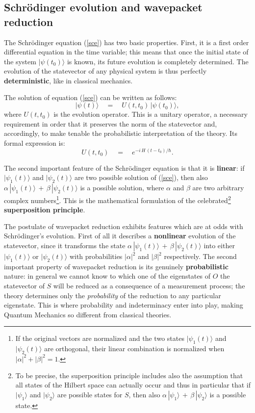 \documentclass[12pt]{article}
\begin{document}
\subsection{Schr\"odinger evolution and wavepacket reduction}
\label{sec12}

The Schr\"odinger equation (\ref{sce}) has two basic properties.
First, it is a first order differential equation in the time
variable; this means that once the initial state of the system
$|\psi(t_{0})\rangle$ is known, its future evolution is completely
determined. The evolution of the statevector of any physical
system is thus perfectly {\bf deterministic}, like in classical
mechanics.

The solution of equation (\ref{sce}) can be written as follows:
\begin{equation}
|\psi(t)\rangle \quad = \quad U(t, t_{0})\, |\psi(t_{0})\rangle,
\end{equation}
where $U(t, t_{0})$ is the evolution operator. This is a unitary
operator, a necessary requirement in order that it preserves the
norm of the statevector and, accordingly, to make tenable the
probabilistic interpretation of the theory. Its formal expression
is:
\begin{equation}
U(t, t_{0}) \quad = \quad e^{\displaystyle -i\, H\,
(t-t_{0})/\hbar}.
\end{equation}

The second important feature of the Schr\"odinger equation is that
it is {\bf linear}: if $|\psi_{1}(t)\rangle$ and
$|\psi_{2}(t)\rangle$ are two possible solution of (\ref{sce}),
then also $\alpha\, |\psi_{1}(t)\rangle \, + \, \beta\,
|\psi_{2}(t)\rangle$ is a possible solution, where $\alpha$ and
$\beta$ are two arbitrary complex numbers\footnote{If the original
vectors are normalized and the two states $|\psi_{1}(t)\rangle$
and $|\psi_{2}(t)\rangle$ are orthogonal, their linear combination
is normalized when $|\alpha|^{2} + |\beta|^{2} = 1$.}. This is the
mathematical formulation of the celebrated\footnote{To be precise,
the superposition principle includes also the assumption that all
states of the Hilbert space can actually occur and thus in
particular that if $|\psi_{1}\rangle$ and $|\psi_{2}\rangle$ are
possible states for $S$, then also $\alpha\, |\psi_{1}\rangle \, +
\, \beta\, |\psi_{2}\rangle$ is a possible state.} {\bf
superposition principle}.

The postulate of  wavepacket reduction exhibits features which are at
odds with Schr\"odinger's evolution. First of all it describes a
{\bf nonlinear} evolution of the statevector, since it transforms
the state $\alpha\, |\psi_{1}(t)\rangle \, + \, \beta\,
|\psi_{2}(t)\rangle$ into either $|\psi_{1}(t)\rangle$ or
$|\psi_{2}(t)\rangle$ with probabilities $|\alpha|^{2}$ and
$|\beta|^{2}$ respectively. The second important property of
wavepacket reduction is its genuinely {\bf probabilistic} nature:
in general we cannot know to which one of the eigenstates of $O$
the statevector of $S$ will be reduced as a consequence of a
measurement process; the theory determines only the {\it
probability} of the reduction to any particular eigenstate. This
is where probability and indeterminacy enter into play, making
Quantum Mechanics so different from classical theories.
\end{document}
